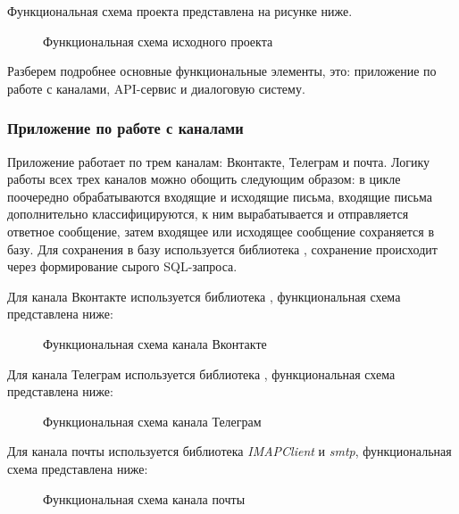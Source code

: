     Функциональная схема проекта представлена на рисунке ниже.
    \begin{figure}[!h]
        \centering
        \caption{Функциональная схема исходного проекта}
        \label{fig:func-schema-before}
    \end{figure}
    
    Разберем подробнее основные функциональные элементы, это: приложение по работе с каналами, API-сервис и диалоговую систему.
    
    \subsubsection*{Приложение по работе с каналами}
    Приложение работает по трем каналам: Вконтакте, Телеграм и почта. Логику работы всех трех каналов можно обощить
    следующим образом: в цикле поочередно обрабатываются входящие  и исходящие письма, входящие письма дополнительно
    классифицируются, к ним вырабатывается и отправляется ответное сообщение, затем входящее или исходящее сообщение
    сохраняется в базу. Для сохранения в базу используется библиотека \textit{}, сохранение происходит через формирование
    сырого SQL-запроса.
    
    Для канала Вконтакте используется библиотека \textit{}, функциональная схема представлена ниже:
    \begin{figure}[!h]
        \centering
        \caption{Функциональная схема канала Вконтакте}
        \label{fig:func-schema-vk-before}
    \end{figure}

    Для канала Телеграм используется библиотека \textit{}, функциональная схема представлена ниже:
    \begin{figure}[!h]
        \centering
        \caption{Функциональная схема канала Телеграм}
        \label{fig:func-schema-tg-before}
    \end{figure}
    
    Для канала почты используется библиотека \textit{IMAPClient} и \textit{smtp},
    функциональная схема представлена ниже:
    \begin{figure}[!h]
        \centering
        \caption{Функциональная схема канала почты}
        \label{fig:func-schema-email-before}
    \end{figure}

